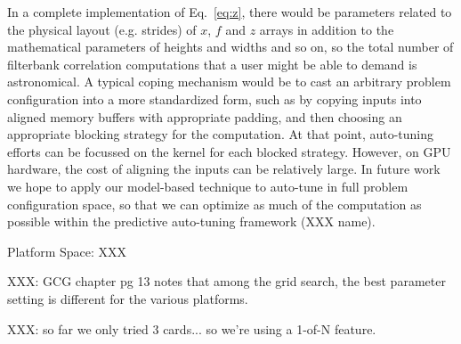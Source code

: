 \documentclass{sig-alternate}
\begin{document}
In a complete implementation of Eq.~\ref{eq:z}, there would be parameters
related to the physical layout (e.g. strides) of $x$, $f$ and $z$ arrays in
addition to the mathematical parameters of heights and widths and so on,
so the total number of filterbank correlation computations that a user might
be able to demand is astronomical.
A typical coping mechanism would be to cast an arbitrary problem configuration into a more
standardized form, such as by copying inputs into aligned memory buffers with
appropriate padding, and then choosing an appropriate blocking strategy for
the computation. At that point, auto-tuning efforts can be focussed on the
kernel for each blocked strategy. However, on GPU hardware, the cost of
aligning the inputs can be relatively large.  In future work we hope to apply
our model-based technique to auto-tune in full problem configuration space, so
that we can optimize as much of the computation as possible within the
predictive auto-tuning framework (XXX name).

Platform Space: XXX

XXX: GCG chapter pg 13 notes that among the grid search, the best parameter
setting is different for the various platforms.

XXX: so far we only tried 3 cards... so we're using a 1-of-N feature.



\end{document}
